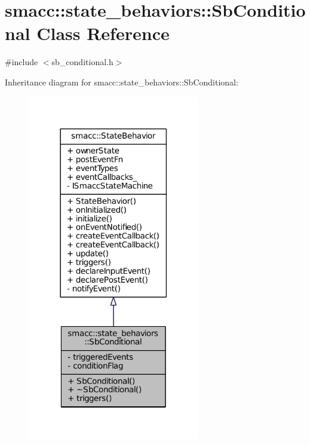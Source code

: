 \hypertarget{classsmacc_1_1state__behaviors_1_1SbConditional}{}\section{smacc\+:\+:state\+\_\+behaviors\+:\+:Sb\+Conditional Class Reference}
\label{classsmacc_1_1state__behaviors_1_1SbConditional}


{\ttfamily \#include $<$sb\+\_\+conditional.\+h$>$}



Inheritance diagram for smacc\+:\+:state\+\_\+behaviors\+:\+:Sb\+Conditional\+:
\nopagebreak
\begin{figure}[H]
\begin{center}
\leavevmode
\includegraphics[width=213pt]{classsmacc_1_1state__behaviors_1_1SbConditional__inherit__graph}
\end{center}
\end{figure}


